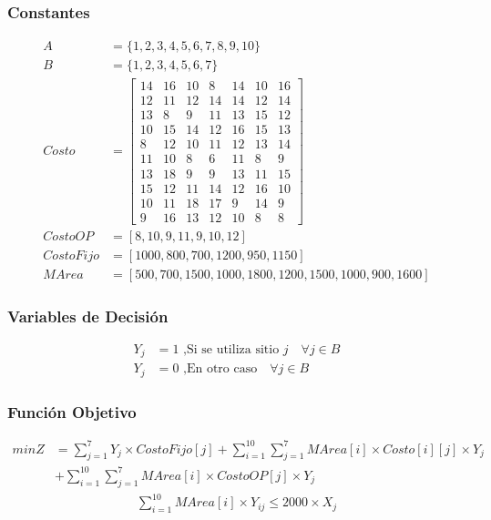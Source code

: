 \documentclass[a4paper,12pt]{article}
\begin{document}
\subsubsection{Constantes}
\begin{equation*}
\begin{split}
A&=\{1,2,3,4,5,6,7,8,9,10\}\\
B&=\{1,2,3,4,5,6,7\}\\
Costo &= \begin{bmatrix}
14 & 16 & 10 & 8 & 14 & 10 & 16\\
12 & 11 & 12 & 14 & 14 & 12 & 14\\
13 & 8 & 9 & 11 & 13 & 15 & 12\\
10 & 15 & 14 & 12 & 16 & 15 & 13\\
8 & 12 & 10 & 11 & 12 & 13 & 14\\
11 & 10 & 8 & 6 & 11 & 8 & 9\\
13 & 18 & 9 & 9 & 13 & 11 & 15\\
15 & 12 & 11 & 14 & 12 & 16 & 10\\
10 & 11 & 18 & 17 & 9 & 14 & 9\\
9 & 16 & 13 & 12 & 10 & 8 & 8
\end{bmatrix}\\
CostoOP&=[8,10,9,11,9,10,12]\\
CostoFijo&=[1000,800,700,1200,950,1150]\\
MArea&=[500,700,1500,1000,1800,1200,1500,1000,900,1600]
\end{split}
\end{equation*}
\subsubsection{Variables de Decisión}
\begin{equation*}
\begin{split}
	Y_j&=1\text{ ,Si se utiliza sitio } j\quad \forall j \in B\\
	Y_{j}&= 0 \text{ ,En otro caso}\quad \forall j \in B
\end{split}
\end{equation*}
\subsubsection{Función Objetivo}
\begin{equation*}
\begin{split}
minZ &= \sum_{j=1}^{7}Y_j\times CostoFijo[j] + \sum_{i=1}^{10}\sum_{j=1}^{7}MArea[i]\times Costo[i][j]\times Y_j\\ 
&+ \sum_{i=1}^{10}\sum_{j=1}^{7}MArea[i]\times CostoOP[j]\times Y_j
\end{split}
\end{equation*}
\begin{equation*}
\begin{split}
\sum_{i=1}^{10}MArea[i]\times Y_{ij}\leq 2000\times X_j
\end{split}
\end{equation*}
\end{document}
